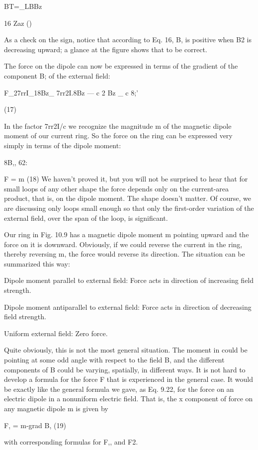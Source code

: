{BT=_LBBz

16
Zaz ()

As a check on the sign, notice that according to Eq. 16, B, is positive
when B2 is decreasing upward; a glance at the figure shows that to
be correct.

The force on the dipole can now be expressed in terms of the
gradient of the component B; of the external field:

F_27rrI_18Bz_ 7rr2I.8Bz
 ---  c 2 Bz _ c 8;'

(17)

In the factor 7rr2I/c we recognize the magnitude m of the magnetic
dipole moment of our current ring. So the force on the ring can be
expressed very simply in terms of the dipole moment:

8B,,
62:

F = m (18)
We haven't proved it, but you will not be surprised to hear that for
small loops of any other shape the force depends only on the 
current-area product, that is, on the dipole moment. The shape doesn't
matter. Of course, we are discussing only loops small enough so
that only the first-order variation of the external field, over the span
of the loop, is significant.

Our ring in Fig. 10.9 has a magnetic dipole moment m pointing
upward and the force on it is downward. Obviously, if we could
reverse the current in the ring, thereby reversing m, the force would
reverse its direction. The situation can be summarized this way:

Dipole moment parallel to external field: Force acts in direction
of increasing field strength.

Dipole moment antiparallel to external field: Force acts in
direction of decreasing field strength.

Uniform external field: Zero force.

Quite obviously, this is not the most general situation. The
moment in could be pointing at some odd angle with respect to the
field B, and the different components of B could be varying, spatially,
in different ways. It is not hard to develop a formula for the force F
that is experienced in the general case. It would be exactly like the
general formula we gave, as Eq. 9.22, for the force on an electric
dipole in a nonuniform electric field. That is, the x component of
force on any magnetic dipole m is given by

F, = m-grad B, (19)

with corresponding formulas for F,, and F2.

}
